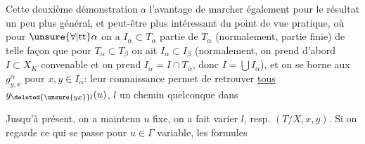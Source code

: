 Cette deuxième démonstration a l'avantage de marcher également pour  le résultat un peu plus général, et peut-être plus intéressant du point de vue pratique, où pour $\unsure{\forall|\text{tt}}\alpha$ on a $I_\alpha\subset T_\alpha$ partie  de $T_\alpha$ (normalement, partie finie) de telle façon que pour $T_\alpha\subset T_\beta$ on ait $I_\alpha\subset I_\beta$ (normalement, on prend d'abord $I\subset X_K$ convenable et on prend $I_\alpha=I\cap T_\alpha$, donc $I=\bigcup I_\alpha$), et on se borne aux $g^\alpha_{y,x}$ pour $x,y\in I_\alpha$: leur connaissance permet de retrouver \uline{tous}  $g_{\deleted{\unsure{yx}}l}(u)$, $l$ un chemin quelconque dans


Jusqu'à présent, on a maintenu $u$ fixe, on a fait varier $l$, resp. $(T/X,x,y)$. Si on regarde ce qui se passe pour $u\in\Gamma$ variable, les formules

